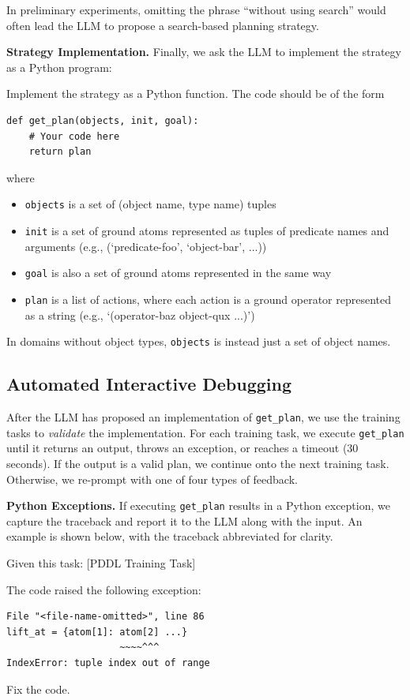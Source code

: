 \documentclass[letterpaper]{article} %
\begin{document}
In preliminary experiments, omitting the phrase ``without using search'' would often lead the LLM to propose a search-based planning strategy.

\textbf{Strategy Implementation.}
Finally, we ask the LLM to implement the strategy as a Python program:

\begin{tcolorbox}[left=2pt,right=2pt]
\footnotesize
Implement the strategy as a Python function. The code should be of the form

\begin{verbatim}
def get_plan(objects, init, goal):
    # Your code here
    return plan    
\end{verbatim}

where
\begin{itemize}
    \item \texttt{objects} is a set of (object name, type name) tuples
    \item \texttt{init} is a set of ground atoms represented as tuples of predicate names and arguments (e.g., (`predicate-foo', `object-bar', ...))
    \item \texttt{goal} is also a set of ground atoms represented in the same way
    \item \texttt{plan} is a list of actions, where each action is a ground operator represented as a string (e.g., `(operator-baz object-qux ...)')
\end{itemize}
\end{tcolorbox}

In domains without object types, \texttt{objects} is instead just a set of object names.

\subsection{Automated Interactive Debugging}

After the LLM has proposed an implementation of \texttt{get\_plan}, we use the training tasks to \emph{validate} the implementation.
For each training task, we execute \texttt{get\_plan} until it returns an output, throws an exception, or reaches a timeout (30 seconds).
If the output is a valid plan, we continue onto the next training task.
Otherwise, we re-prompt with one of four types of feedback.

\textbf{Python Exceptions.} If executing \texttt{get\_plan} results in a Python exception, we capture the traceback and report it to the LLM along with the input.
An example is shown below, with the traceback abbreviated for clarity.
\begin{tcolorbox}[left=2pt,right=2pt]
Given this task: [PDDL Training Task]

The code raised the following exception:
\begin{verbatim}
File "<file-name-omitted>", line 86
lift_at = {atom[1]: atom[2] ...}
                    ~~~~^^^
IndexError: tuple index out of range
\end{verbatim}

Fix the code.
\end{tcolorbox}
\end{document}
